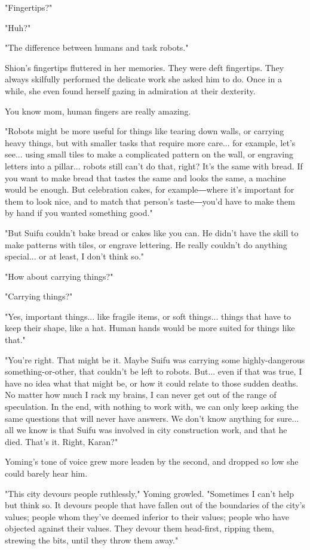 "Fingertips?"

"Huh?"

"The difference between humans and task robots."

Shion's fingertips fluttered in her memories. They were deft fingertips.
They always skilfully performed the delicate work she asked him to do.
Once in a while, she even found herself gazing in admiration at their
dexterity.

You know mom, human fingers are really amazing.

"Robots might be more useful for things like tearing down walls, or
carrying heavy things, but with smaller tasks that require more care...
for example, let's see... using small tiles to make a complicated
pattern on the wall, or engraving letters into a pillar... robots still
can't do that, right? It's the same with bread. If you want to make
bread that tastes the same and looks the same, a machine would be
enough. But celebration cakes, for example―where it's important for them
to look nice, and to match that person's taste―you'd have to make them
by hand if you wanted something good."

"But Suifu couldn't bake bread or cakes like you can. He didn't have the
skill to make patterns with tiles, or engrave lettering. He really
couldn't do anything special... or at least, I don't think so."

"How about carrying things?"

"Carrying things?"

"Yes, important things... like fragile items, or soft things... things
that have to keep their shape, like a hat. Human hands would be more
suited for things like that."

"You're right. That might be it. Maybe Suifu was carrying some
highly-dangerous something-or-other, that couldn't be left to robots.
But... even if that was true, I have no idea what that might be, or how
it could relate to those sudden deaths. No matter how much I rack my
brains, I can never get out of the range of speculation. In the end,
with nothing to work with, we can only keep asking the same questions
that will never have answers. We don't know anything for sure... all we
know is that Suifu was involved in city construction work, and that he
died. That's it. Right, Karan?"

Yoming's tone of voice grew more leaden by the second, and dropped so
low she could barely hear him.

"This city devours people ruthlessly," Yoming growled. "Sometimes I
can't help but think so. It devours people that have fallen out of the
boundaries of the city's values; people whom they've deemed inferior to
their values; people who have objected against their values. They devour
them head-first, ripping them, strewing the bits, until they throw them
away."

